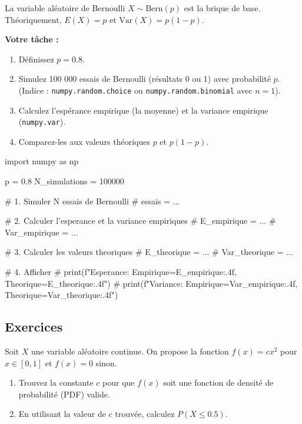 \begin{exercicebox}
La variable aléatoire de Bernoulli $X \sim \text{Bern}(p)$ est la brique de base. Théoriquement, $E(X) = p$ et $\text{Var}(X) = p(1-p)$.

\textbf{Votre tâche :}
\begin{enumerate}
    \item Définissez $p=0.8$.
    \item Simulez 100 000 essais de Bernoulli (résultats 0 ou 1) avec probabilité $p$. (Indice : \texttt{numpy.random.choice} ou \texttt{numpy.random.binomial} avec $n=1$).
    \item Calculez l'espérance empirique (la moyenne) et la variance empirique (\texttt{numpy.var}).
    \item Comparez-les aux valeurs théoriques $p$ et $p(1-p)$.
\end{enumerate}

\begin{codecell}
import numpy as np

p = 0.8
N_simulations = 100000

# 1. Simuler N essais de Bernoulli
# essais = ...

# 2. Calculer l'esperance et la variance empiriques
# E_empirique = ...
# Var_empirique = ...

# 3. Calculer les valeurs theoriques
# E_theorique = ...
# Var_theorique = ...

# 4. Afficher
# print(f"Esperance: Empirique={E_empirique:.4f}, Theorique={E_theorique:.4f}")
# print(f"Variance:  Empirique={Var_empirique:.4f}, Theorique={Var_theorique:.4f}")
\end{codecell}
\end{exercicebox}



\subsection{Exercices}


\begin{exercicebox}
Soit $X$ une variable aléatoire continue. On propose la fonction $f(x) = c x^2$ pour $x \in [0, 1]$ et $f(x) = 0$ sinon.
\begin{enumerate}
    \item Trouvez la constante $c$ pour que $f(x)$ soit une fonction de densité de probabilité (PDF) valide.
    \item En utilisant la valeur de $c$ trouvée, calculez $P(X \le 0.5)$.
\end{enumerate}
\end{exercicebox}

